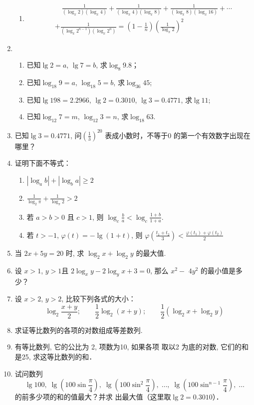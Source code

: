 \begin{enumerate}
\begin{enumerate}
  \item \[\begin{split}
    &\quad \frac{1}{(\log_x 2)(\log_x 4)}+   \frac{1}{(\log_x 4)(\log_x 8)}+   \frac{1}{(\log_x 8)(\log_x 16)}+\cdots \\
    &+   \frac{1}{(\log_x 2^{n-1})(\log_x 2^n)}=\left(1-\frac{1}{n}\right)\left(\frac{1}{\log_x 2}\right)^2
  \end{split}\]
\end{enumerate}

\item \begin{enumerate}
  \item 已知$\lg2=a$, $\lg7=b$, 求$\log_8 9.8$；
  \item 已知$\log_{18}9=a$, $\log_{18}5=b$, 求$\log_{36}45$;
  \item 已知$\lg198=2.2966$, $\lg2=0.3010$, $\lg3=0.4771$, 求$\lg 11$;
  \item 已知$\log_{12}7=m$, $\log_{12}3=n$, 求$\log_{18}63$.
\end{enumerate} 
\item 已知$\lg3=0.4771$, 问$\left(\frac{1}{3}\right)^{20}$
表成小数时，不等于0
的第一个有效数字出现在哪里？

\item  证明下面不等式：
\begin{enumerate}
  \item $\left|\log _{a} b\right|+\left|\log _{b} a\right| \geqslant 2$
  \item  $\frac{1}{\log _{2} \pi}+\frac{1}{\log _{\pi} 2}>2$
  \item 若 $a>b>0$ 且 $c>1$, 则 $\log _{c} \frac{b}{a}<\log _{c} \frac{1+b}{1+a}$.
  \item 若 $t>-1$, $\varphi(t)=-\lg(1+t)$, 则 $\varphi\left(\frac{t_{1}+t_{2}}{3}\right)<\frac{\varphi\left(t_{1}\right)+\varphi\left(t_{2}\right)}{2}$
\end{enumerate}


\item 当 $2 x+5 y=20$ 时, 求 $\log _{2} x+\log _{2} y$ 的最大值.
\item 设 $x>1$, $y>1$且 $2 \log _{x} y-2 \log _{y} x+3=0$, 那么 $x^{2}-$ $4 y^{2}$ 的最小值是多少？
\item  设 $x>2$, $y>2$, 比较下列各式的大小：
$$\log _{2} \frac{x+y}{2} ;\qquad \frac{1}{2} \log _{2}(x+y); \qquad \frac{1}{2}\left(\log _{2} x+\log _{2} y\right)$$
\item  求证等比数列的各项的对数组成等差数列.
\item  有等比数列, 它的公比为 2, 项数为10, 如果各项 取以2 为底的对数, 它们的和是25, 求这等比数列的和．

\item 试问数列
$$\lg100,\; \lg\left(100\sin\frac{\pi}{4}\right),\; \lg\left(100\sin^2\frac{\pi}{4}\right),\; \ldots ,\; \lg\left(100\sin^{n-1}\frac{\pi}{4}\right),\; \ldots$$
的前多少项的和的值最大？并求
出最大值（这里取$\lg2=0.3010$）．
\end{enumerate}

